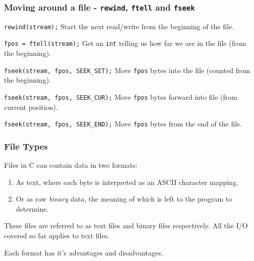 \documentclass[table]{beamer}
\newif\ifschigh\schighfalse
\newcommand{\kw}[1]{\ifschigh\textcolor{red}{#1}\else\textcolor{keyword}{#1}\fi}
\begin{document}
\begin{frame}
\frametitle{Moving around a file - {\tt rewind}, {\tt ftell} and {\tt fseek}}
\begin{block}{\tt rewind(stream);}
Start the next read/write from the beginning of the file.
\end{block}

\begin{block}{\tt fpos = ftell(stream);}
Get an \kw{\tt int} telling us how far we are in the file (from the beginning).
\end{block}

\begin{block}{\tt fseek(stream, fpos, SEEK\_SET);}
Move {\tt fpos} bytes into the file (counted from the beginning).
\end{block}

\begin{block}{\tt fseek(stream, fpos, SEEK\_CUR);}
Move {\tt fpos} bytes forward into file (from current position).
\end{block}

\begin{block}{\tt fseek(stream, fpos, SEEK\_END);}
Move {\tt fpos} bytes from the end of the file.
\end{block}
\end{frame}

\begin{frame}
\frametitle{File Types}
Files in C can contain data in two formats:
\begin{enumerate}
\item As text, where each byte is interpreted as an ASCII character mapping.
\item Or as raw \emph{binary} data, the meaning of which is left to the program to determine.
\end{enumerate}

These files are referred to as text files and binary files respectively. All the I/O covered so far applies to text files.

\begin{block}{}
\begin{center}
Each format has it's advantages and disadvantages.
\end{center}
\end{block}
\end{frame}
\end{document}
